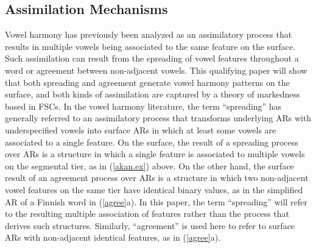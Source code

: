 \documentclass[,doc,floatsintext]{apa6}
\theoremstyle{definition}
\theoremstyle{definition}
\theoremstyle{definition}
\theoremstyle{remark}
\begin{document}
\subsection{Assimilation Mechanisms}\label{assimilation-mechanisms}

Vowel harmony has previously been analyzed as an assimilatory process
that results in multiple vowels being associated to the same feature on
the surface. Such assimilation can result from the spreading of vowel
features throughout a word or agreement between non-adjacent vowels.
This qualifying paper will show that both spreading and agreement
generate vowel harmony patterns on the surface, and both kinds of
assimilation are captured by a theory of markedness based in FSCs. In
the vowel harmony literature, the term \enquote{spreading} has generally
referred to an assimilatory process that transforms underlying ARs with
underspecified vowels into surface ARs in which at least some vowels are
associated to a single feature. On the surface, the result of a
spreading process over ARs is a structure in which a single feature is
associated to multiple vowels on the segmental tier, as in
(\ref{akan.ex}) above. On the other hand, the surface result of an
agreement process over ARs is a structure in which two non-adjacent
vowel features on the same tier have identical binary values, as in the
simplified AR of a Finnish word in (\ref{agree}a). In this paper, the
term \enquote{spreading} will refer to the resulting multiple
association of features rather than the process that derives such
structures. Similarly, \enquote{agreement} is used here to refer to
surface ARs with non-adjacent identical features, as in (\ref{agree}a).
\end{document}
